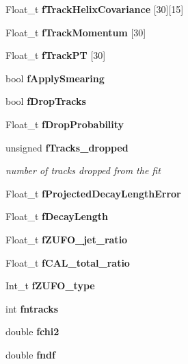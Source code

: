 \begin{CompactItemize}
\item 
Float\_\-t \textbf{f\-Track\-Helix\-Covariance} [30][15]\label{classTVertex_ba8a6b7eee13edf9424a1fdbbbd9ad60}

\item 
Float\_\-t \textbf{f\-Track\-Momentum} [30]\label{classTVertex_3edb2ba5ffd100ed6401a794e3824b69}

\item 
Float\_\-t \textbf{f\-Track\-PT} [30]\label{classTVertex_d4c8a732d9aed7c1a35f7b0c6fe16e98}

\item 
bool \textbf{f\-Apply\-Smearing}\label{classTVertex_c7021df951e5f22178c8fc11e91f7fa8}

\item 
bool \textbf{f\-Drop\-Tracks}\label{classTVertex_0a9814c7fef5e2e83e0cf3eb0bad97f9}

\item 
Float\_\-t \textbf{f\-Drop\-Probability}\label{classTVertex_bb658a5b67d7f685ab5228c6a3d42c46}

\item 
unsigned \bf{f\-Tracks\_\-dropped}\label{classTVertex_ac7c645fb686be351e50df99f6690a71}

\begin{CompactList}\small\item\em number of tracks dropped from the fit \item\end{CompactList}\item 
Float\_\-t \textbf{f\-Projected\-Decay\-Length\-Error}\label{classTVertex_37766a7bef01d71f8866e8a85184a5ef}

\item 
Float\_\-t \textbf{f\-Decay\-Length}\label{classTVertex_d0b37678f898bf971717880610184cf7}

\item 
Float\_\-t \textbf{f\-ZUFO\_\-jet\_\-ratio}\label{classTVertex_09ebee49acfe107933f7797b2e1f9e06}

\item 
Float\_\-t \textbf{f\-CAL\_\-total\_\-ratio}\label{classTVertex_d94ac7c290997b57474ae9dfd338ce6c}

\item 
Int\_\-t \textbf{f\-ZUFO\_\-type}\label{classTVertex_0e801712a5ba41151f2b3367297c818c}

\item 
int \textbf{fntracks}\label{classTVertex_d4a1065dbaebb6366b58b4048ca9f073}

\item 
double \textbf{fchi2}\label{classTVertex_9020c3875638aa3afc4c4275399d6c00}

\item 
double \textbf{fndf}\label{classTVertex_5a737cc975692b08e6cc6d88fc09b536}

\end{CompactItemize}


